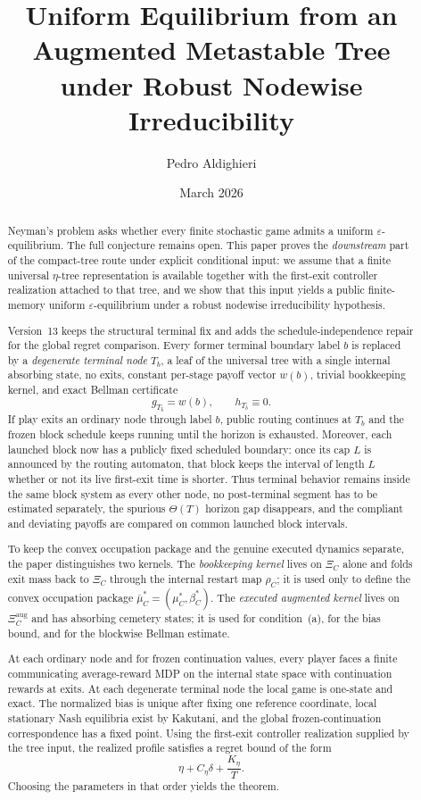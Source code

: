 \documentclass[12pt]{article}
\title{\textbf{Uniform Equilibrium from an Augmented Metastable Tree\\under Robust Nodewise Irreducibility}}
\author{Pedro Aldighieri}
\date{March 2026}
\theoremstyle{definition}
\newcommand{\eps}{\varepsilon}
\newcommand{\1}{\mathbf{1}}
\begin{document}
\maketitle



\begin{abstract}
Neyman's problem asks whether every finite stochastic game admits a uniform
$\eps$-equilibrium. The full conjecture remains open. This paper proves the
\emph{downstream} part of the compact-tree route under explicit conditional input:
we assume that a finite universal $\eta$-tree representation is available together
with the first-exit controller realization attached to that tree, and we show that
this input yields a public finite-memory uniform $\eps$-equilibrium under a robust
nodewise irreducibility hypothesis.

Version~13 keeps the structural terminal fix and adds the
schedule-independence repair for the global regret comparison. Every former
terminal boundary label $b$ is replaced by a \emph{degenerate terminal node}
$T_b$, a leaf of the universal tree with a single internal absorbing state, no
exits, constant per-stage payoff vector $w(b)$, trivial bookkeeping kernel, and
exact Bellman certificate
\[
g_{T_b}=w(b),
\qquad
h_{T_b}\equiv 0.
\]
If play exits an ordinary node through label $b$, public routing continues at
$T_b$ and the frozen block schedule keeps running until the horizon is exhausted.
Moreover, each launched block now has a publicly fixed scheduled boundary: once
its cap $L$ is announced by the routing automaton, that block keeps the interval
of length $L$ whether or not its live first-exit time is shorter. Thus terminal
behavior remains inside the same block system as every other node, no
post-terminal segment has to be estimated separately, the spurious $\Theta(T)$
horizon gap disappears, and the compliant and deviating payoffs are compared on
common launched block intervals.

To keep the convex occupation package and the genuine executed dynamics separate,
the paper distinguishes two kernels. The \emph{bookkeeping kernel} lives on
$\Xi_C$ alone and folds exit mass back to $\Xi_C$ through the internal restart map
$\rho_C$; it is used only to define the convex occupation package
$\bar\mu_C^*=(\mu_C^*,\beta_C^*)$. The \emph{executed augmented kernel} lives on
$\Xi_C^{\mathrm{aug}}$ and has absorbing cemetery states; it is used for
condition~\textnormal{(a)}, for the bias bound, and for the blockwise Bellman
estimate.

At each ordinary node and for frozen continuation values, every player faces a
finite communicating average-reward MDP on the internal state space with
continuation rewards at exits. At each degenerate terminal node the local game is
one-state and exact. The normalized bias is unique after fixing one reference
coordinate, local stationary Nash equilibria exist by Kakutani, and the global
frozen-continuation correspondence has a fixed point. Using the first-exit
controller realization supplied by the tree input, the realized profile satisfies a
regret bound of the form
\[
\eta + C_\eta\delta + \frac{K_\eta}{T}.
\]
Choosing the parameters in that order yields the theorem.
\end{abstract}
\end{document}
